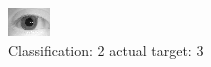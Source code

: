 \begin{figure}[h!]
\begin{center}
\includegraphics[width=0.60\columnwidth]{figures/ID1102_class_2_target_3.png}
\end{center}
\caption{ Classification: 2 actual target: 3}
\label{fig:ID1102_class_2_target_3}
\end{figure}
